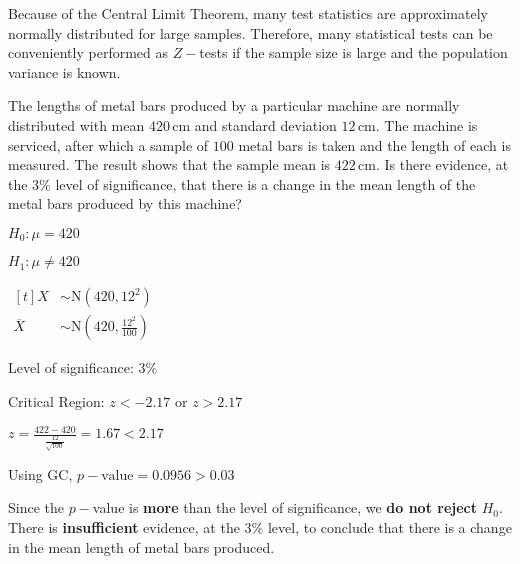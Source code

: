 \documentclass[11pt,a4paper]{book}
\begin{document}
Because of the Central Limit Theorem, many test statistics are approximately
normally distributed for large samples. Therefore, many statistical
tests can be conveniently performed as $Z-$tests if the sample size
is large and the population variance is known.

\begin{example}

The lengths of metal bars produced by a particular machine are normally
distributed with mean $420\,\text{cm}$ and standard deviation $12\,\text{cm}$.
The machine is serviced, after which a sample of $100$ metal bars
is taken and the length of each is measured. The result shows that
the sample mean is $422\,\text{cm}$. Is there evidence, at the $3\%$
level of significance, that there is a change in the mean length of
the metal bars produced by this machine?

\Solution

\begin{steps}[leftmargin=1.5cm]

\item  $H_{0}:\mu=420$

$H_{1}:\mu\neq420$

\item 
$
\begin{aligned}[t]
X & \sim\text{N}\left(420,12^{2}\right)\\
\overline{X} & \sim\text{N}\left(420,\frac{12^{2}}{100}\right)
\end{aligned}
$

\item  Level of significance: $3\%$

Critical Region: $z<-2.17$ or $z>2.17$

\item  ${\displaystyle z=\frac{422-420}{\frac{12}{\sqrt{100}}}=1.67}<2.17$

\item  Using GC, $p-\text{value}=0.0956>0.03$

\item 

\begin{tcolorbox}[colback=white, colframe=black,boxrule=.4pt, sharpish corners,box align=center]

Since the $p-$value is \textbf{more} than the level of significance,
we \textbf{do not reject} $H_{0}$. There is \textbf{insufficient}
evidence, at the $3\%$ level, to conclude that there is a change
in the mean length of metal bars produced.
\end{tcolorbox}

\end{steps}

\end{example}
\end{document}
